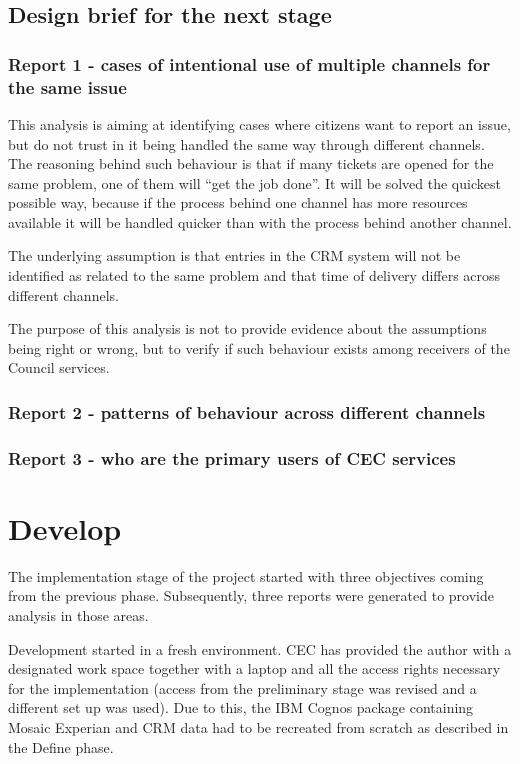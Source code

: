 		\subsection{Design brief for the next stage}
		
			\subsubsection{Report 1 - cases of intentional use of multiple channels for the same issue}
			
This analysis is aiming at identifying cases where citizens want to report an issue, but do not trust in it being handled the same way through different channels. The reasoning behind such behaviour is that if many tickets are opened for the same problem, one of them will “get the job done”. It will be solved the quickest possible way, because if the process behind one channel has more resources available it will be handled quicker than with the process behind another channel.

The underlying assumption is that entries in the CRM system will not be identified as related to the same problem and that time of delivery differs across different channels.

The purpose of this analysis is not to provide evidence about the assumptions being right or wrong, but to verify if such behaviour exists among receivers of the Council services.
			
			\subsubsection{Report 2 - patterns of behaviour across different channels}
			
			\subsubsection{Report 3 - who are the primary users of CEC services}

	\section{Develop}
	
The implementation stage of the project started with three objectives coming from the previous phase. Subsequently, three reports were generated to provide analysis in those areas.

Development started in a fresh environment. CEC has provided the author with a designated work space together with a laptop and all the access rights necessary for the implementation (access from the preliminary stage was revised and a different set up was used). Due to this, the IBM Cognos package containing Mosaic Experian and CRM data had to be recreated from scratch as described in the Define phase.

